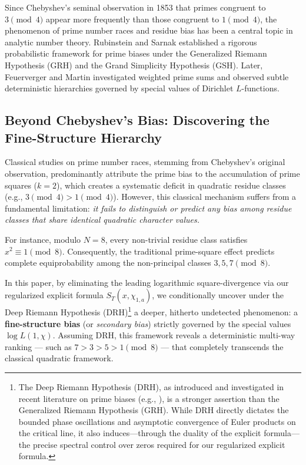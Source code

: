 \documentclass[12pt,reqno]{amsart}
\theoremstyle{definition}
\theoremstyle{remark}
\numberwithin{equation}{section}
\begin{document}
Since Chebyshev's seminal observation in 1853 that primes congruent to $3 \pmod 4$ appear more frequently than those congruent to $1 \pmod 4$, the phenomenon of prime number races and residue bias has been a central topic in analytic number theory. Rubinstein and Sarnak \cite{RS94} established a rigorous probabilistic framework for prime biases under the Generalized Riemann Hypothesis (GRH) and the Grand Simplicity Hypothesis (GSH). Later, Feuerverger and Martin \cite{FM00} investigated weighted prime sums and observed subtle deterministic hierarchies governed by special values of Dirichlet $L$-functions.

\subsection{Beyond Chebyshev's Bias: Discovering the Fine-Structure Hierarchy}

Classical studies on prime number races, stemming from Chebyshev's original observation, predominantly attribute the prime bias to the accumulation of prime squares ($k=2$), which creates a systematic deficit in quadratic residue classes (e.g., $3 \pmod 4 > 1 \pmod 4$). However, this classical mechanism suffers from a fundamental limitation: \emph{it fails to distinguish or predict any bias among residue classes that share identical quadratic character values.}

For instance, modulo $N=8$, every non-trivial residue class satisfies $x^2 \equiv 1 \pmod 8$. Consequently, the traditional prime-square effect predicts complete equiprobability among the non-principal classes $3, 5, 7 \pmod 8$. 

In this paper, by eliminating the leading logarithmic square-divergence via our regularized explicit formula $S_T(x, \chi_{1,a})$, we conditionally uncover under the Deep Riemann Hypothesis (DRH)\footnote{The Deep Riemann Hypothesis (DRH), as introduced and investigated in recent literature on prime biases (e.g., \cite{AK23}), is a stronger assertion than the Generalized Riemann Hypothesis (GRH). 
While DRH directly dictates the bounded phase oscillations and asymptotic convergence of Euler products on the critical line, it also induces—through the duality of the explicit formula—the precise spectral control over zeros required for our regularized explicit formula.} a deeper, hitherto undetected phenomenon: 
a \textbf{fine-structure bias} (or \emph{secondary bias}) strictly governed by the special values $\log L(1, \chi)$. Assuming DRH, this framework reveals a deterministic multi-way ranking --- such as $7 > 3 > 5 > 1 \pmod 8$ --- that completely transcends the classical quadratic framework.
\end{document}
